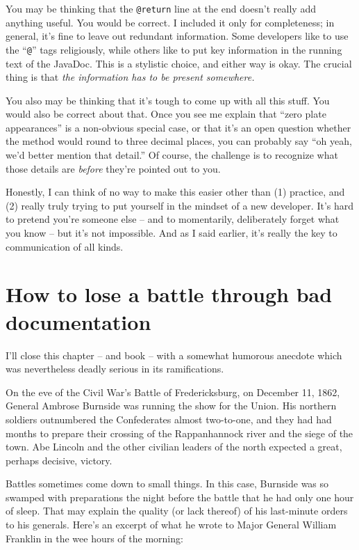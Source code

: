 You may be thinking that the \texttt{@return} line at the end doesn't really
add anything useful. You would be correct. I included it only for
completeness; in general, it's fine to leave out redundant information. Some
developers like to use the ``\texttt{@}'' tags religiously, while others like
to put key information in the running text of the JavaDoc. This is a stylistic
choice, and either way is okay. The crucial thing is that \textit{the
information has to be present somewhere.}

You also may be thinking that it's tough to come up with all this stuff. You
would also be correct about that. Once you see me explain that ``zero plate
appearances'' is a non-obvious special case, or that it's an open question
whether the method would round to three decimal places, you can probably say
``oh yeah, we'd better mention that detail.'' Of course, the challenge is to
recognize what those details are \textit{before} they're pointed out to you.

Honestly, I can think of no way to make this easier other than (1) practice,
and (2) really truly trying to put yourself in the mindset of a new developer.
It's hard to pretend you're someone else -- and to momentarily, deliberately
forget what you know -- but it's not impossible. And as I said earlier, it's
really the key to communication of all kinds.

\section[How to lose a battle]{How to lose a battle through bad documentation}

I'll close this chapter -- and book -- with a somewhat humorous anecdote which
was nevertheless deadly serious in its ramifications.

On the eve of the Civil War's Battle of Fredericksburg, on December 11, 1862,
General Ambrose Burnside was running the show for the Union. His northern
soldiers outnumbered the Confederates almost two-to-one, and they had had
months to prepare their crossing of the Rappanhannock river and the siege of
the town. Abe Lincoln and the other civilian leaders of the north expected a
great, perhaps decisive, victory.

Battles sometimes come down to small things. In this case, Burnside was so
swamped with preparations the night before the battle that he had only one
hour of sleep. That may explain the quality (or lack thereof) of his
last-minute orders to his generals. Here's an excerpt of what he wrote to
Major General William Franklin in the wee hours of the morning:



